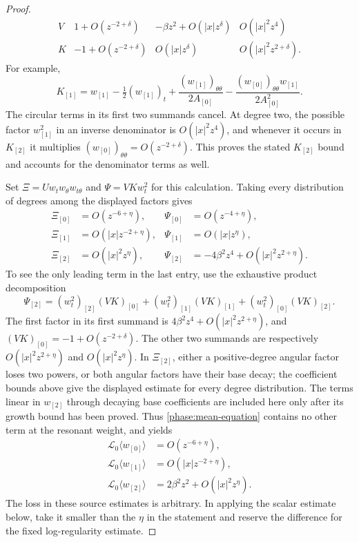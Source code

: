 \begin{proof}
\[\begin{array}{c|ccc}
 V&1+O(z^{-2+\delta})&-\beta z^2+O(|x|z^\delta)&O(|x|^2z^4)\\
 K&-1+O(z^{-2+\delta})&O(|x|z^\delta)&O(|x|^2z^{2+\delta}).
 \end{array}
\]
For example,
\[
 K_{[1]}=w_{[1]}-\tfrac12(w_{[1]})_t
       +\frac{(w_{[1]})_{\theta\theta}}{2A_{[0]}}
       -\frac{(w_{[0]})_{\theta\theta}w_{[1]}}{2A_{[0]}^2}.
\]
The circular terms in its first two summands cancel.  At degree two,
the possible factor $w_{[1]}^2$ in an inverse denominator is
$O(|x|^2z^4)$, and whenever it occurs in $K_{[2]}$ it multiplies
$(w_{[0]})_{\theta\theta}=O(z^{-2+\delta})$.  This proves the stated
$K_{[2]}$ bound and accounts for the denominator terms as well.

Set $\Xi=U w_t w_\theta w_{t\theta}$ and $\Psi=V K w_t^2$ for this
calculation.  Taking every distribution of degrees among the displayed
factors gives
\begin{equation}
 \begin{aligned}
 \Xi_{[0]}&=O(z^{-6+\eta}),&\Psi_{[0]}&=O(z^{-4+\eta}),\\
 \Xi_{[1]}&=O(|x|z^{-2+\eta}),&\Psi_{[1]}&=O(|x|z^\eta),\\
 \Xi_{[2]}&=O(|x|^2z^\eta),&
 \Psi_{[2]}&=-4\beta^2z^4+O(|x|^2z^{2+\eta}).
 \end{aligned}
 \label{phase:mean-product-bounds}
\end{equation}
To see the only leading term in the last entry, use the exhaustive
product decomposition
\[
 \Psi_{[2]}=(w_t^2)_{[2]}(VK)_{[0]}
          +(w_t^2)_{[1]}(VK)_{[1]}
          +(w_t^2)_{[0]}(VK)_{[2]}.
\]
The first factor in its first summand is
$4\beta^2z^4+O(|x|^2z^{2+\eta})$, and $(VK)_{[0]}=-1+O(z^{-2+\delta})$.
The other two summands are respectively $O(|x|^2z^{2+\eta})$ and
$O(|x|^2z^\eta)$.  In $\Xi_{[2]}$, either a positive-degree angular
factor loses two powers, or both angular factors have their base decay;
the coefficient bounds above give the displayed estimate for every
degree distribution.  The terms linear in $w_{[2]}$ through decaying
base coefficients are included here only after its growth bound has
been proved.  Thus \eqref{phase:mean-equation} contains no other term
at the resonant weight, and yields
\begin{equation}
 \begin{aligned}
 \mathcal L_0\langle w_{[0]}\rangle&=O(z^{-6+\eta}),\\
 \mathcal L_0\langle w_{[1]}\rangle&=O(|x|z^{-2+\eta}),\\
 \mathcal L_0\langle w_{[2]}\rangle
             &=2\beta^2z^2+O(|x|^2z^\eta).
 \end{aligned}
 \label{phase:mean-forcing}
\end{equation}
The loss in these source estimates is arbitrary.  In applying the scalar
estimate below, take it smaller than the $\eta$ in the statement and
reserve the difference for the fixed log-regularity estimate.


\end{proof}
